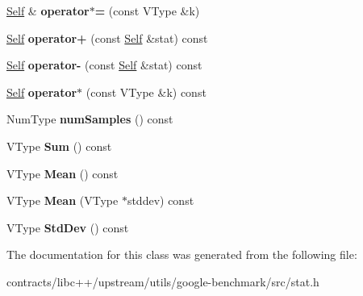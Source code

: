 \begin{DoxyCompactItemize}
\mbox{\hyperlink{classbenchmark_1_1_stat1}{Self}} \& {\bfseries operator$\ast$=} (const V\+Type \&k)
\item 
\mbox{\label{classbenchmark_1_1_stat1_a6b2646250105878b496a8c5d6f29198e}} 
\mbox{\hyperlink{classbenchmark_1_1_stat1}{Self}} {\bfseries operator+} (const \mbox{\hyperlink{classbenchmark_1_1_stat1}{Self}} \&stat) const
\item 
\mbox{\label{classbenchmark_1_1_stat1_a7a283ca41bd5a8b7daecfc5522b54d40}} 
\mbox{\hyperlink{classbenchmark_1_1_stat1}{Self}} {\bfseries operator-\/} (const \mbox{\hyperlink{classbenchmark_1_1_stat1}{Self}} \&stat) const
\item 
\mbox{\label{classbenchmark_1_1_stat1_a1e8773318d0a75e44c028a0d73a5fda7}} 
\mbox{\hyperlink{classbenchmark_1_1_stat1}{Self}} {\bfseries operator$\ast$} (const V\+Type \&k) const
\item 
\mbox{\label{classbenchmark_1_1_stat1_a43a10e8953f9e19fba0c3d624f643db9}} 
Num\+Type {\bfseries num\+Samples} () const
\item 
\mbox{\label{classbenchmark_1_1_stat1_af89aae9a52e3359218596e2f79343a45}} 
V\+Type {\bfseries Sum} () const
\item 
\mbox{\label{classbenchmark_1_1_stat1_a785165f3dddc99892488993e1c4c01ce}} 
V\+Type {\bfseries Mean} () const
\item 
\mbox{\label{classbenchmark_1_1_stat1_aa8dbaed8c2ea9da7e47a9aa3bbf94762}} 
V\+Type {\bfseries Mean} (V\+Type $\ast$stddev) const
\item 
\mbox{\label{classbenchmark_1_1_stat1_ae0ca58cf5b61d7c0c4ed9a3fe34055c3}} 
V\+Type {\bfseries Std\+Dev} () const
\end{DoxyCompactItemize}


The documentation for this class was generated from the following file\+:\begin{DoxyCompactItemize}
\item 
contracts/libc++/upstream/utils/google-\/benchmark/src/stat.\+h\end{DoxyCompactItemize}
